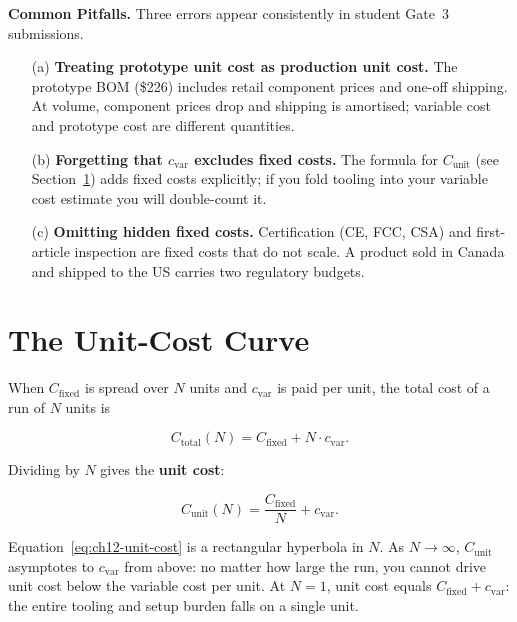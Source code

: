\noindent\textbf{Common Pitfalls.}
Three errors appear consistently in student Gate~3 submissions.

\begin{enumerate}
  \item[(a)] \textbf{Treating prototype unit cost as production unit cost.}
        The prototype BOM (\$226) includes retail component prices and one-off
        shipping.
        At volume, component prices drop and shipping is amortised; variable
        cost and prototype cost are different quantities.
  \item[(b)] \textbf{Forgetting that $c_{\text{var}}$ excludes fixed costs.}
        The formula for $C_{\text{unit}}$ (see Section~\ref{sec:ch12-unit-cost})
        adds fixed costs explicitly; if you fold tooling into your variable cost
        estimate you will double-count it.
  \item[(c)] \textbf{Omitting hidden fixed costs.}
        Certification (CE, FCC, CSA) and first-article inspection are fixed costs
        that do not scale.
        A product sold in Canada and shipped to the US carries two regulatory
        budgets.
\end{enumerate}

\section{The Unit-Cost Curve}
\label{sec:ch12-unit-cost}

When $C_{\text{fixed}}$ is spread over $N$ units and $c_{\text{var}}$ is paid
per unit, the total cost of a run of $N$ units is

\[
  C_{\text{total}}(N) = C_{\text{fixed}} + N \cdot c_{\text{var}}.
\]

Dividing by $N$ gives the \textbf{unit cost}:

\begin{equation}
  C_{\text{unit}}(N) = \frac{C_{\text{fixed}}}{N} + c_{\text{var}}.
  \label{eq:ch12-unit-cost}
\end{equation}

Equation~\ref{eq:ch12-unit-cost} is a rectangular hyperbola in $N$.
As $N \to \infty$, $C_{\text{unit}}$ asymptotes to $c_{\text{var}}$ from above:
no matter how large the run, you cannot drive unit cost below the variable cost
per unit.
At $N = 1$, unit cost equals $C_{\text{fixed}} + c_{\text{var}}$: the entire
tooling and setup burden falls on a single unit.

